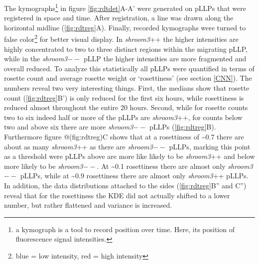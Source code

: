 \documentclass[11pt,singlespacinge,twoside]{reedthesis} %
\begin{document}
The kymographs\footnote{a kymograph is a tool to record position over time. Here, its position of fluorescence signal intensities.} in figure \ref{fig:rdtdet}A-A' were generated on pLLPs that were registered in space and time. After registration, a line was drawn along the horizontal midline (\ref{fig:rdtreg}A). Finally, recorded kymographs were turned to false color\footnote{blue = low intensity, red = high intensity} for better visual display. In \emph{shroom3}++ the higher intensities are highly concentrated to two to three distinct regions within the migrating pLLP, while in the \emph{shroom3}\(--\) pLLP the higher intensities are more fragmented and overall reduced. To analyze this statistically all pLLPs were quantified in terms of rosette count and average rosette weight or `rosettiness' (see section \ref{CNN}).
The numbers reveal two very interesting things. First, the medians show that rosette count (\ref{fig:rdtreg}B') is only reduced for the first six hours, while rosettiness is reduced almost throughout the entire 20 hours. Second, while for rosette counts two to six indeed half or more of the pLLPs are \emph{shroom3}++, for counts below two and above six there are more \emph{shroom3}\(--\) pLLPs (\ref{fig:rdtreg}B). Furthermore figure @(fig:rdtreg)C shows that at a rosettiness of \textasciitilde{}0.7 there are about as many \emph{shroom3}++ as there are \emph{shroom3}\(--\) pLLPs, marking this point as a threshold were pLLPs above are more like likely to be \emph{shroom3}++ and below more likely to be \emph{shroom3}\(--\). At \textasciitilde{}0.1 rosettiness there are almost only \emph{shroom3}\(--\) pLLPs, while at \textasciitilde{}0.9 rosettiness there are almost only \emph{shroom3}++ pLLPs.
In addition, the data distributions attached to the sides (\ref{fig:rdtreg}B'' and C'') reveal that for the rosettiness the KDE did not actually shifted to a lower number, but rather flattened and variance is increased.
\end{document}
